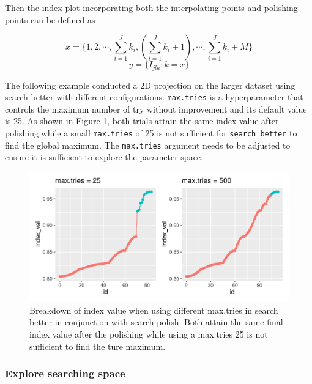 \documentclass[12pt]{article}
\begin{document}
Then the index plot incorporating both the interpolating points and
polishing points can be defined as

\[x = \{1, 2, \cdots, \sum_{i = 1}^J k_i,(\sum_{i = 1}^J k_i + 1), \cdots,  \sum_{i = 1}^J k_i + M\}\]
\[y = \{I_{jlk}: k = x\}\]

The following example conducted a 2D projection on the larger dataset
using search better with different configurations. \texttt{max.tries} is
a hyperparameter that controls the maximum number of try without
improvement and its default value is 25. As shown in Figure
\ref{trace-compare}, both trials attain the same index value after
polishing while a small \texttt{max.tries} of 25 is not sufficient for
\texttt{search\_better} to find the global maximum. The
\texttt{max.tries} argument needs to be adjusted to ensure it is
sufficient to explore the parameter space.

\begin{figure}
\centering
\includegraphics{paper_files/figure-latex/polish-1.pdf}
\caption{\label{trace-compare}Breakdown of index value when using
different max.tries in search better in conjunction with search polish.
Both attain the same final index value after the polishing while using a
max.tries 25 is not sufficient to find the ture maximum.}
\end{figure}

\newpage

\hypertarget{animated}{%
\subsubsection{Explore searching space}\label{animated}}
\end{document}
